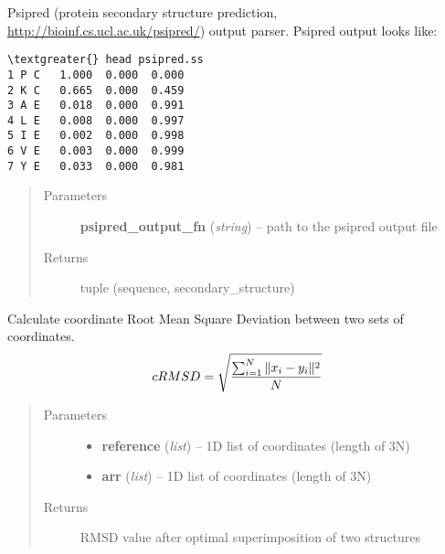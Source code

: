 \documentclass[letterpaper,10pt,english]{sphinxmanual}
\begin{document}

\begin{fulllineitems}
\label{api:pycabs.parsePsipredOutput}
Psipred (protein secondary structure prediction, \href{http://bioinf.cs.ucl.ac.uk/psipred/}{http://bioinf.cs.ucl.ac.uk/psipred/}) output parser. 
Psipred output looks like:

\begin{Verbatim}[commandchars=\\\{\}]
\textgreater{} head psipred.ss
1 P C   1.000  0.000  0.000
2 K C   0.665  0.000  0.459
3 A E   0.018  0.000  0.991
4 L E   0.008  0.000  0.997
5 I E   0.002  0.000  0.998
6 V E   0.003  0.000  0.999
7 Y E   0.033  0.000  0.981
\end{Verbatim}
\begin{quote}\begin{description}
\item[{Parameters}] \leavevmode
\textbf{psipred\_output\_fn} (\emph{string}) -- path to the psipred output file

\item[{Returns}] \leavevmode
tuple (sequence, secondary\_structure)

\end{description}\end{quote}

\end{fulllineitems}


\begin{fulllineitems}
\label{api:pycabs.rmsd}
Calculate coordinate Root Mean Square Deviation between two sets of coordinates.
\begin{gather}
\begin{split}cRMSD = \sqrt{ \sum_{i=1}^N \|x_{i} - y_{i}\|^2 \over N}\end{split}\notag
\end{gather}\begin{quote}\begin{description}
\item[{Parameters}] \leavevmode\begin{itemize}
\item {} 
\textbf{reference} (\emph{list}) -- 1D list of coordinates (length of 3N)

\item {} 
\textbf{arr} (\emph{list}) -- 1D list of coordinates (length of 3N)

\end{itemize}

\item[{Returns}] \leavevmode
RMSD value after optimal superimposition of two structures

\end{description}\end{quote}

\end{fulllineitems}
\end{document}
